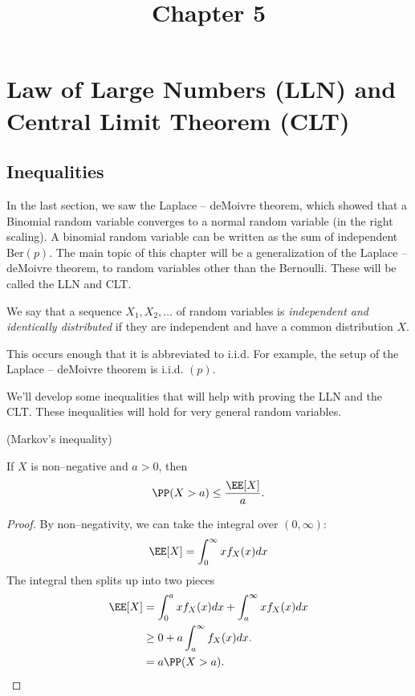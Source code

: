 \documentclass{ximera}
\title{Chapter 5}
\begin{document}
\begin{abstract}
\end{abstract}
\maketitle
\section{Law of Large Numbers (LLN) and Central Limit Theorem (CLT)}

\subsection{Inequalities}
In the last section, we saw the Laplace -- deMoivre theorem, which showed that a Binomial random variable converges to a normal random variable (in the right scaling). A binomial random variable can be written as the sum of independent $\mathrm{Ber}(p)$. The main topic of this chapter will be a generalization of the Laplace -- deMoivre theorem, to random variables other than the Bernoulli. These will be called the LLN and CLT.

\begin{definition}
We say that a sequence $X_1,X_2,\ldots$ of random variables is \textit{independent and identically distributed} if they are independent and have a common distribution $X$.
\end{definition}
This occurs enough that it is abbreviated to i.i.d. For example, the setup of the Laplace -- deMoivre theorem is i.i.d. $(p)$.

We'll develop some inequalities that will help with proving the LLN and the CLT. These inequalities will hold for very general random variables. 

\begin{theorem}
(Markov's inequality)

If $X$ is non--negative and $a>0$, then
$$
\PP(X > a ) \leq \frac{\EE[X]}{a}.
$$
\end{theorem}
\begin{proof}
By non--negativity, we can take the integral over $(0,\infty)$:
\begin{equation*}
\EE[X]=\int_{0}^{\infty} x f_{X}(x) d x
\end{equation*}
The integral then splits up into two pieces
\begin{align*}
\EE[X] &= \int_0^a x f_X(x)dx + \int_a^{\infty} x f_X(x) dx\\
& \geq 0 + a \int_a^{\infty} f_X(x)dx.\\
&= a \PP(X >a).
\end{align*}
\end{proof}
\end{document}
